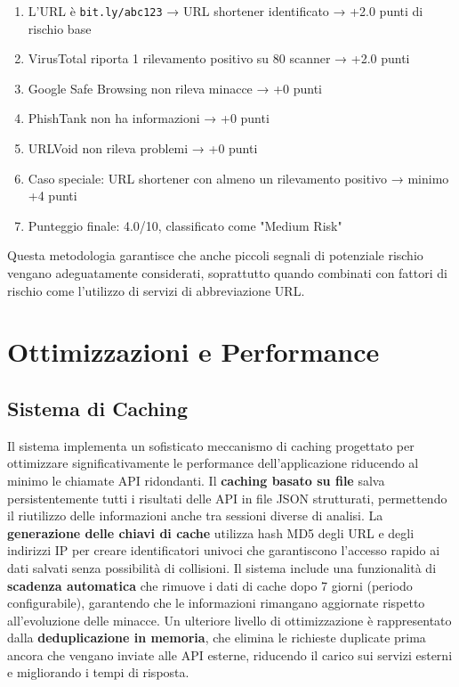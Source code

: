 \documentclass{article}
\begin{document}
\begin{enumerate}
    \item L'URL è \texttt{bit.ly/abc123} → URL shortener identificato → +2.0 punti di rischio base
    \item VirusTotal riporta 1 rilevamento positivo su 80 scanner → +2.0 punti
    \item Google Safe Browsing non rileva minacce → +0 punti
    \item PhishTank non ha informazioni → +0 punti
    \item URLVoid non rileva problemi → +0 punti
    \item Caso speciale: URL shortener con almeno un rilevamento positivo → minimo +4 punti
    \item Punteggio finale: 4.0/10, classificato come "Medium Risk"
\end{enumerate}

Questa metodologia garantisce che anche piccoli segnali di potenziale rischio vengano adeguatamente considerati, soprattutto quando combinati con fattori di rischio come l'utilizzo di servizi di abbreviazione URL.
\newpage
\section{Ottimizzazioni e Performance}

\subsection{Sistema di Caching}

Il sistema implementa un sofisticato meccanismo di caching progettato per ottimizzare significativamente le performance dell'applicazione riducendo al minimo le chiamate API ridondanti. Il \textbf{caching basato su file} salva persistentemente tutti i risultati delle API in file JSON strutturati, permettendo il riutilizzo delle informazioni anche tra sessioni diverse di analisi.
\newline \newline
La \textbf{generazione delle chiavi di cache} utilizza hash MD5 degli URL e degli indirizzi IP per creare identificatori univoci che garantiscono l'accesso rapido ai dati salvati senza possibilità di collisioni. Il sistema include una funzionalità di \textbf{scadenza automatica} che rimuove i dati di cache dopo 7 giorni (periodo configurabile), garantendo che le informazioni rimangano aggiornate rispetto all'evoluzione delle minacce.
\newline \newline
Un ulteriore livello di ottimizzazione è rappresentato dalla \textbf{deduplicazione in memoria}, che elimina le richieste duplicate prima ancora che vengano inviate alle API esterne, riducendo il carico sui servizi esterni e migliorando i tempi di risposta.
\end{document}
